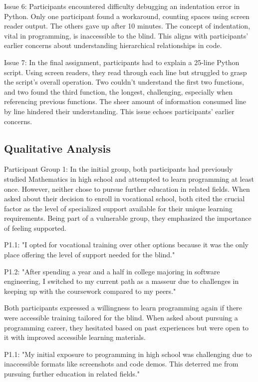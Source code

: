 Issue 6: Participants encountered difficulty debugging an indentation error in Python. Only one participant found a workaround, counting spaces using screen reader output. The others gave up after 10 minutes. The concept of indentation, vital in programming, is inaccessible to the blind. This aligns with participants' earlier concerns about understanding hierarchical relationships in code.

Issue 7: In the final assignment, participants had to explain a 25-line Python script. Using screen readers, they read through each line but struggled to grasp the script's overall operation. Two couldn't understand the first two functions, and two found the third function, the longest, challenging, especially when referencing previous functions. The sheer amount of information consumed line by line hindered their understanding. This issue echoes participants' earlier concerns.

\subsection{Qualitative Analysis}


Participant Group 1: In the initial group, both participants had previously studied Mathematics in high school and attempted to learn programming at least once. However, neither chose to pursue further education in related fields. When asked about their decision to enroll in vocational school, both cited the crucial factor as the level of specialized support available for their unique learning requirements. Being part of a vulnerable group, they emphasized the importance of feeling supported.

P1.1: "I opted for vocational training over other options because it was the only place offering the level of support needed for the blind."

P1.2: "After spending a year and a half in college majoring in software engineering, I switched to my current path as a masseur due to challenges in keeping up with the coursework compared to my peers."

Both participants expressed a willingness to learn programming again if there were accessible training tailored for the blind. When asked about pursuing a programming career, they hesitated based on past experiences but were open to it with improved accessible learning materials.

P1.1: "My initial exposure to programming in high school was challenging due to inaccessible formats like screenshots and code demos. This deterred me from pursuing further education in related fields."


